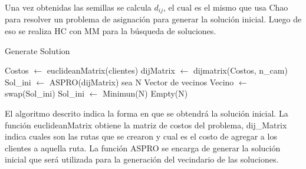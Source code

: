 \documentclass[letter, 10pt]{article}
\begin{document}
Una vez obtenidas las semillas se calcula $d_{ij}$, el cual es el mismo que usa Chao ~\cite{Chao} para resolver un problema de asignación para generar la solución inicial. Luego de eso se realiza HC con MM para la búsqueda de soluciones.

\begin{algorithm}
\caption{Generate Solution}\label{generar soluciones}
\begin{algorithmic}[1]
\State  Costos $\gets$ euclideanMatrix(clientes)
\State   dijMatrix $\gets$ dijmatrix(Costos, n\_cam)
\State Sol\_ini $\gets$ ASPRO(dijMatrix)
\State sea N Vector de vecinos
        \State Vecino $\gets$ swap(Sol\_ini)
        \State Sol\_ini $\gets$ Minimun(N)
        \State Empty(N)
        \EndIf
    \EndWhile
\EndProcedure
\end{algorithmic}
\end{algorithm}

El algoritmo descrito indica la forma en que se obtendrá la solución inicial. La función euclideanMatrix obtiene la matriz de costos del problema, dij\_Matrix indica cuales son las rutas que se crearon y cual es el costo de agregar a los clientes a aquella ruta. La función ASPRO se encarga de generar la solución inicial que será utilizada para la generación del vecindario de las soluciones.




\end{document}

